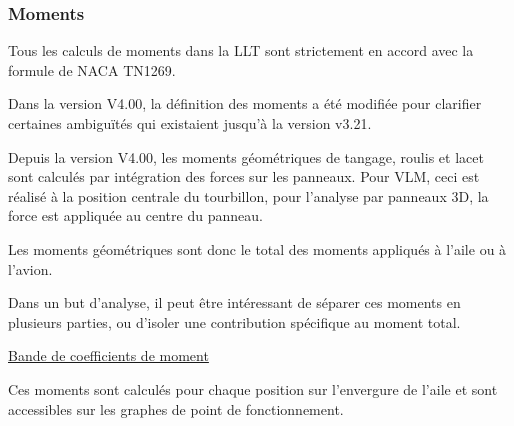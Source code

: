\documentclass[a4paper,twoside,12pt,dvips]{article}
\begin{document}
\clearpage

\subsubsection{Moments}
\label{section : moments}

Tous les calculs de moments dans la LLT sont strictement en accord avec la formule de NACA TN1269.

Dans la version V4.00, la définition des moments a été modifiée pour clarifier certaines ambiguïtés qui existaient jusqu’à la version v3.21.

Depuis la version V4.00, les moments géométriques de tangage, roulis et lacet sont calculés par intégration des forces sur les panneaux. Pour VLM, ceci est réalisé à la position centrale du tourbillon, pour l’analyse par panneaux 3D, la force est appliquée au centre du panneau.

Les moments géométriques sont donc le total des moments appliqués à l’aile ou à l’avion. 

Dans un but d’analyse, il peut être intéressant de séparer ces moments en plusieurs parties, ou d’isoler une contribution spécifique au moment total. 

\underline{Bande de coefficients de moment}

Ces moments sont calculés pour chaque position sur l’envergure de l’aile et sont accessibles sur les graphes de point de fonctionnement.
\end{document}
